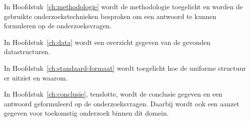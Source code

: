 In Hoofdstuk~\ref{ch:methodologie} wordt de methodologie toegelicht en worden de gebruikte onderzoekstechnieken besproken om een antwoord te kunnen formuleren op de onderzoeksvragen.

In Hoofdstuk~\ref{ch:data} wordt een overzicht gegeven van de gevonden datastructuren.

In Hoofdstuk~\ref{ch:standaard-formaat} wordt toegelicht hoe de uniforme structuur er uitziet en waarom.

In Hoofdstuk~\ref{ch:conclusie}, tenslotte, wordt de conclusie gegeven en een antwoord geformuleerd op de onderzoeksvragen. Daarbij wordt ook een aanzet gegeven voor toekomstig onderzoek binnen dit domein.